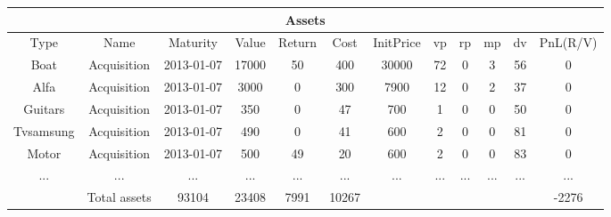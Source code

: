 \begin{longtable}{|c|c|c|c|c|c|c|c|c|c|c|c|}
\hline
\multicolumn{12}{|c|}{Assets} \\
\hline
Type & Name & Maturity & Value & Return & Cost & InitPrice & vp & rp & mp & dv & PnL(R/V)\\
\hline
Boat & Acquisition & 2013-01-07 & 17000 & 50 & 400 & 30000 & 72 & 0 & 3 & 56 & 0\\
\hline
Alfa & Acquisition & 2013-01-07 & 3000 & 0 & 300 & 7900 & 12 & 0 & 2 & 37 & 0\\
\hline
Guitars & Acquisition & 2013-01-07 & 350 & 0 & 47 & 700 & 1 & 0 & 0 & 50 & 0\\
\hline
Tvsamsung & Acquisition & 2013-01-07 & 490 & 0 & 41 & 600 & 2 & 0 & 0 & 81 & 0\\
\hline
Motor & Acquisition & 2013-01-07 & 500 & 49 & 20 & 600 & 2 & 0 & 0 & 83 & 0\\
\hline
 ... & ... & ... & ... & ... & ... & ... & ... & ... & ... & ... & ...\\
\hline
& Total assets & 93104 & 23408 & 7991 & 10267 & & & & & & -2276\\
\hline
\end{longtable}
